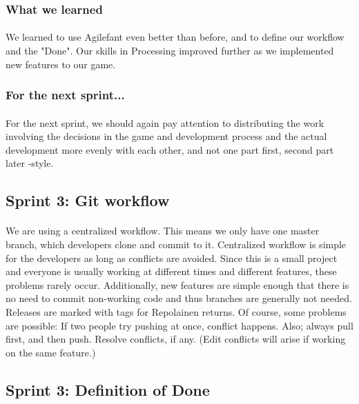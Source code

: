 \subsubsection{What we learned}

\paragraph{} We learned to use Agilefant even better than before, and to define our workflow and the "Done". Our skills in Processing improved further as we implemented new features to our game.

\subsubsection{For the next sprint...}

\paragraph{} For the next sprint, we should again pay attention to distributing the work involving the decisions in the game and development process and the actual development more evenly with each other, and not one part first, second part later -style.

\subsection{Sprint 3: Git workflow}

\paragraph{} We are using a centralized workflow. This means we only have one master branch, which developers clone and commit to it. Centralized workflow is simple for the developers as long as conflicts are avoided. Since this is a small project and everyone is usually working at different times and different features, these problems rarely occur. Additionally, new features are simple enough that there is no need to commit non-working code and thus branches are generally not needed. Releases are marked with tags for Repolainen returns. Of course, some problems are possible: If two people try pushing at once, conflict happens. Also; always pull first, and then push. Resolve conflicts, if any. (Edit conflicts will arise if working on the same feature.)

\subsection{Sprint 3: Definition of Done}

